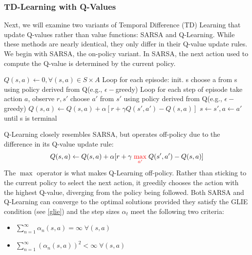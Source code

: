   \subsubsection{TD-Learning with Q-Values}\label{sarsa and q learning}
  Next, we will examine two variants of Temporal Difference (TD) Learning that update 
  Q-values rather than value functions: SARSA and Q-Learning. While these methods are 
  nearly identical, they only differ in their Q-value update rules.\newline
  We begin with SARSA, the on-policy variant. In SARSA, the next action used to compute
  the Q-value is determined by the current policy.
  \begin{algorithm}[H]
    \large
    \caption{SARSA (on-policy TD control)}\label{Sarsa}
    \begin{algorithmic}
      \STATE $Q(s,a)\gets 0, \forall (s,a) \in S \times A$
      \STATE Loop for each episode:
      \STATE \quad init. s
      \STATE \quad choose a from s using policy derived from Q(e.g., $\epsilon-$greedy)
      \STATE \quad Loop for each step of episode
      \STATE \qquad take action $a$, observe $r,s'$ 
      \STATE \qquad choose $a'$ from $s'$ using policy derived from Q(e.g., $\epsilon-$greedy)
      \STATE \qquad $Q(s,a) \gets Q(s,a) + \alpha[r+\gamma Q(s',a')-Q(s,a)] $
      \STATE \qquad $s \gets s',a \gets a'$
      \STATE \quad until s is terminal
    \end{algorithmic}
  \end{algorithm}
  Q-Learning closely resembles SARSA, but operates off-policy due to the difference in 
  its Q-value update rule:
  $$Q(s,a) \gets Q(s,a) + \alpha[r+\gamma \;{\color{red}\max\limits_{a'}}\;Q(s',a')-Q(s,a)] $$
  The $\max$ operator is what makes Q-Learning off-policy. Rather than sticking to the current 
  policy to select the next action, it greedily chooses the action with the highest Q-value, 
  diverging from the policy being followed. Both SARSA and Q-Learning can converge to the optimal solutions 
  provided they satisfy the GLIE condition (see \ref{glie}) and the step sizes $\alpha_t$ meet the following two
  criteria:
  \begin{itemize}\label{robbins munro}
    \item $\sum_{n=1}^{\infty} \alpha_n(s,a) = \infty \;\forall (s,a)$
    \item $\sum_{n=1}^{\infty} (\alpha_n(s,a))^2 < \infty \;\forall (s,a)$
  \end{itemize}


